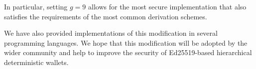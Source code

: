 \documentclass[12pt, a4paper, twocolumn]{article}
\begin{document}
In particular, setting $g=9$ allows for the most secure implementation that also satisfies the requirements of the most common derivation schemes.

We have also provided implementations of this modification in several programming languages. We hope that this modification will be adopted by the wider community and help to improve the security of Ed25519-based hierarchical deterministic wallets.


\nocite{*}


\end{document}
